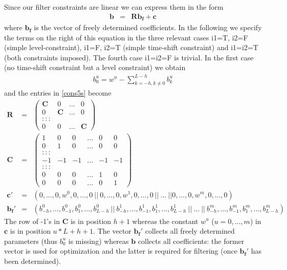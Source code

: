 \documentclass[11pt]{article}
\begin{document}
Since our filter constraints are linear we can express them in the form
\begin{eqnarray}\label{cons5s}
\mathbf{b}&=&\mathbf{R b_{f}}+\mathbf{c}
\end{eqnarray}
where $\mathbf{b_f}$ is the vector of freely determined coefficients. In the following we specify the terms on the right of this equation in the three relevant cases i1=T, i2=F (simple level-constraint), i1=F, i2=T (simple time-shift constraint) and i1=i2=T (both constraints imposed). The fourth case i1=i2=F is trivial. In the first case (no time-shift constraint but a level constraint) we obtain
\begin{eqnarray*}
b_0^u=w^u-\sum_{k=-h,k\not=0}^{L-h}b_k^u
\end{eqnarray*}
and the entries in \ref{cons5s}  become
\begin{eqnarray}
\mathbf{R}&=&\left(\begin{array}{cccc}
\mathbf{C}&0&...&0\\
0&\mathbf{C}&...&0\\
:::\\
0&0&...&\mathbf{C}
\end{array}\right)\label{app1}\\
\mathbf{C}&=&\left(\begin{array}{cccccc}
1&0&0&...&0&0\\
0&1&0&...&0&0\\
:::\\
-1&-1&-1&...&-1&-1\\
:::\\
0&0&0&...&1&0\\
0&0&0&...&0&1
\end{array}\right)\label{app2}\\
\mathbf{c}'&=&(0,...,0,w^0,0,...,0~||~0,...,0,w^1,0,...,0~||~...~||0,...,0,w^m,0,...,0)\nonumber\\
\mathbf{b_f}'&=&(b_{-h}^0,...,b_{-1}^0,b_1^0,...,b_{L-h}^0~||~b_{-h}^1,...,b_{-1}^1,b_1^1,...,b_{L-h}^1~||~...~||~b_{-h}^m,...,b_{-1}^m,b_1^m,...,b_{L-h}^m)\nonumber
\end{eqnarray}
The row of -1's in $\mathbf{C}$ is in position $h+1$ whereas the constant $w^u$ ($u=0,...,m$) in $\mathbf{c}$ is in position $u*L+h+1$. The vector $\mathbf{b_f'}$ collects all freely determined parameters (thus $b_0^u$ is missing) whereas $\mathbf{b}$ collects all coefficients: the former vector is used for optimization and the latter is required for filtering (once $\mathbf{b_f'}$ has been determined). \\
\end{document}
